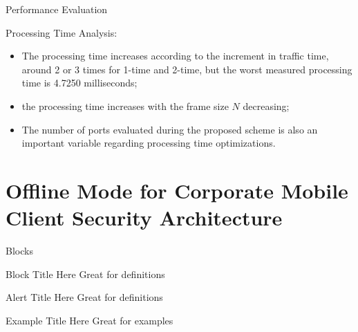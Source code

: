 \documentclass[newPxFont, numfooter, sectionpages]{beamer}
\begin{document}
\begin{frame}{Performance Evaluation}

	Processing Time Analysis:
	\begin{itemize}
		\item The processing time increases according to the increment in traffic time, around 2 or 3 times for 1-time and 2-time, but the worst measured processing time is 4.7250 milliseconds;
		\item the processing time increases with the frame size $N$ decreasing;
		\item The number of ports evaluated during the proposed scheme is also an important variable regarding processing time optimizations.
	\end{itemize}
	
\end{frame}



























\section{Offline Mode for Corporate Mobile Client Security Architecture}
\label{Blocks}

\begin{frame}{Blocks}

\begin{block}{Block Title Here}
		Great for definitions
\end{block}

\begin{alertblock}{Alert Title Here}
		Great for definitions
\end{alertblock}

\begin{exampleblock}{Example Title Here}
		Great for examples
\end{exampleblock}
\end{frame}
\end{document}
